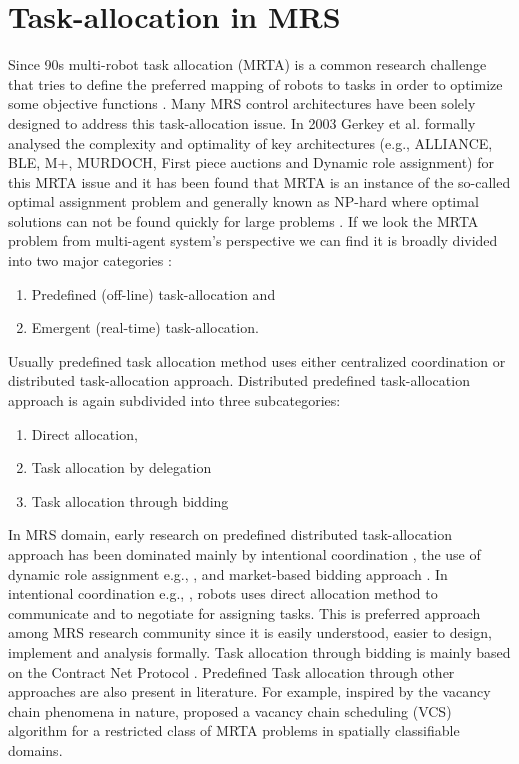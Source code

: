 \section{Task-allocation in MRS}
Since 90s multi-robot task allocation (MRTA) is a common research challenge that tries to define the preferred mapping of robots to tasks in order to optimize some objective functions  \cite{Gerkey+2004}. Many MRS control architectures have been solely designed to address this task-allocation issue. In 2003 Gerkey et al. formally analysed the complexity and optimality of key architectures (e.g., ALLIANCE, BLE, M+, MURDOCH, First piece auctions and Dynamic role assignment) for this MRTA issue and it has been found that MRTA is an instance of the so-called optimal assignment problem \cite{Gerkey+2003} and generally known as NP-hard where optimal solutions can not be found quickly for large problems \cite{Gerkey+2004}. 
If we look the MRTA problem from multi-agent system's perspective we can find it is broadly divided into two major categories \cite{Shen+2001}: 
\begin{enumerate}
\item Predefined (off-line) task-allocation and 
\item Emergent (real-time) task-allocation. 
\end{enumerate}
Usually predefined task allocation method uses either centralized coordination or distributed task-allocation approach. Distributed predefined task-allocation approach is again subdivided into three subcategories: 
\begin{enumerate}
\item Direct allocation, 
\item Task allocation by delegation 
\item Task allocation through bidding
\end{enumerate}
In MRS domain, early research on predefined distributed task-allocation approach has been dominated mainly by intentional coordination \cite{Gerkey+2004,Parker1998}, the use of dynamic role assignment e.g., \cite{Chaimowicz2002}, and market-based bidding approach \cite{Dias+2006}. In intentional coordination e.g., \cite{Parker1998}, robots uses direct allocation method to communicate and to negotiate for assigning tasks. This is preferred approach among MRS research community since it is easily understood, easier to design, implement and analysis formally. Task allocation through bidding is mainly based on the Contract Net Protocol \cite{Davis1988+}. Predefined Task allocation through other approaches are also present in literature. For example, inspired by the vacancy chain phenomena in nature, \cite{Dahl+2003} proposed a vacancy chain scheduling (VCS) algorithm for a restricted class of MRTA problems in spatially classifiable domains.


